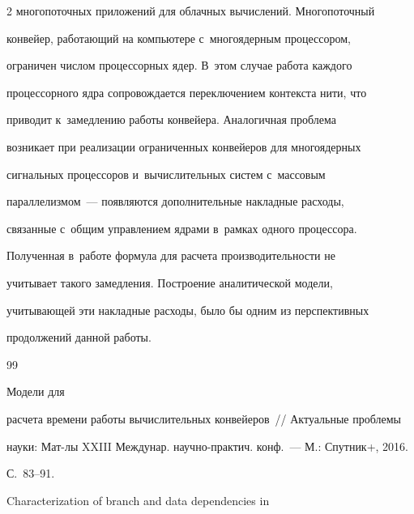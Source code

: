 \begin{multicols}{2}
многопоточных приложений для облачных вычислений. Многопоточный 


конвейер, работающий на компьютере с~многоядерным процессором, 


ограничен числом процессорных ядер. В~этом случае работа каждого 


процессорного ядра сопровождается переключением контекста нити, что 


приводит к~замедлению работы конвейера. Аналогичная проблема 


возникает при реализации ограниченных конвейеров для многоядерных 


сигнальных процессоров и~вы\-чис\-ли\-тель\-ных сис\-тем с~массовым 


параллелизмом~--- появляются дополнительные накладные расходы, 


связанные с~общим управ\-ле\-ни\-ем ядрами в~рамках одного процессора. 


Полученная в~работе формула для расчета производительности не 


учитывает такого замедления. Построение аналитической модели, 


учитывающей эти накладные расходы, было бы одним из перспективных 


продолжений данной работы.





\vspace*{-6pt} 


    


{\small\frenchspacing


 {%




 \begin{thebibliography}{99}




 Модели для 


расчета времени работы вычислительных конвейеров~// Актуальные проблемы 


науки: Мат-лы XXIII Междунар. научно-практич. конф.~--- М.: Спутник+, 2016. 


С.~83--91. 




 Characterization of branch and data dependencies in 



\end{thebibliography}}}
\end{multicols}
